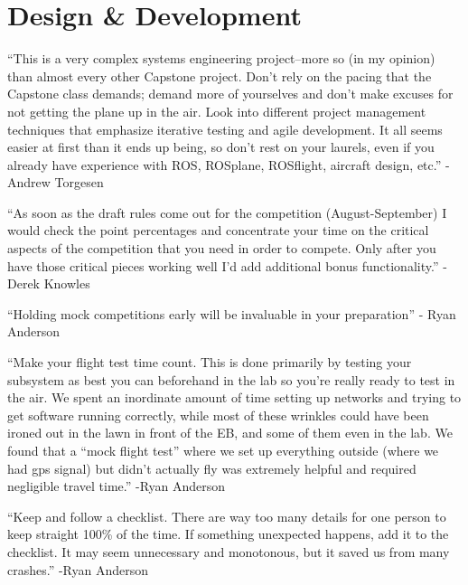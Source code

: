 \hypertarget{h.yankc9crn1j8}{\section{\texorpdfstring{{Design \&
Development}}{Design \& Development}}\label{h.yankc9crn1j8}}

{``This is a very complex systems engineering project--more so (in my
opinion) than almost every other Capstone project. Don't rely on the
pacing that the Capstone class demands; demand more of yourselves and
don't make excuses for not getting the plane up in the air. Look into
different project management techniques that emphasize iterative testing
and agile development. It all seems easier at first than it ends up
being, so don't rest on your laurels, even if you already have
experience with ROS, ROSplane, ROSflight, aircraft design, etc.'' -
Andrew Torgesen}

{}

{``As soon as the draft rules come out for the competition
(August-September) I would check the point percentages and concentrate
your time on the critical aspects of the competition that you need in
order to compete. Only after you have those critical pieces working well
I'd add additional bonus functionality.'' - Derek Knowles}

{}

{``Holding mock competitions early will be invaluable in your
preparation'' - Ryan Anderson}

{}

{``Make your flight test time count. This is done primarily by testing
your subsystem as best you can beforehand in the lab so you're really
ready to test in the air. We spent an inordinate amount of time setting
up networks and trying to get software running correctly, while most of
these wrinkles could have been ironed out in the lawn in front of the
EB, and some of them even in the lab. We found that a ``mock flight
test'' where we set up everything outside (where we had gps signal) but
didn't actually fly was extremely helpful and required negligible travel
time.'' -Ryan Anderson}

{}

{``Keep and follow a checklist. There are way too many details for one
person to keep straight 100\% of the time. If something unexpected
happens, add it to the checklist. It may seem unnecessary and
monotonous, but it saved us from many crashes.'' -Ryan Anderson}

{}

